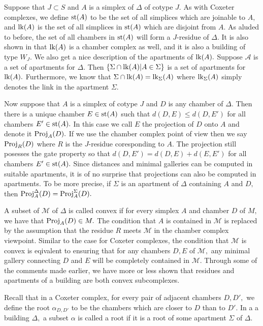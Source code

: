 \documentclass[class=book, crop=false,12 pt]{standalone}
\begin{document}
Suppose that $J\subset S$ and $A$ is a simplex of $\Delta$ of cotype $J.$ As with Coxeter complexes, we define $\mathrm{st}(A)$ to be the set of all simplices which are joinable to $A,$ and $\mathrm{lk}(A)$ is the set of all simplices in $\mathrm{st}(A)$ which are disjoint from $A.$ As aluded to before, the set of all chambers in $\mathrm{st}(A)$ will form a $J$-residue of $\Delta.$ It is also shown in \cite{buildings} that $\mathrm{lk}(A)$ is a chamber complex as well, and it is also a building of type $W_J.$ We also get a nice description of the apartments of $\mathrm{lk}(A).$ Suppose $\mathcal{A}$ is a set of apartments for $\Delta.$ Then $\{\Sigma\cap \mathrm{lk}(A)|A\in \Sigma\}$ is a set of apartments for $\mathrm{lk}(A).$ Furthermore, we know that $\Sigma\cap \mathrm{lk}(A)=\mathrm{lk}_{\Sigma}(A)$ where $\mathrm{lk}_{\Sigma}(A)$ simply denotes the link in the apartment $\Sigma.$

Now suppose that $A$ is a simplex of cotype $J$ and $D$ is any chamber of $\Delta.$ Then there is a unique chamber $E\in \mathrm{st}(A)$ such that $d(D,E)\le d(D,E')$ for all chambers $E'\in \mathrm{st}(A).$ In this case we call $E$ the projection of $D$ onto $A$ and denote it $\mathrm{Proj}_A(D).$ If we use the chamber complex point of view then we say $\mathrm{Proj}_R(D)$ where $R$ is the $J$-residue coresponding to $A.$ The projection still posesses the gate property so that $d(D,E')=d(D,E)+d(E,E')$ for all chambers $E'\in \mathrm{st}(A).$ Since distances and minimal galleries can be computed in suitable apartments, it is of no surprise that projections can also be computed in apartments. To be more precise, if $\Sigma$ is an apartment of $\Delta$ containing $A$ and $D,$ then $\mathrm{Proj}_A^\Delta(D)=\mathrm{Proj}_A^\Sigma(D).$ 

A subset of $\mathcal{M}$ of $\Delta$ is called convex if for every simplex $A$ and chamber $D$ of $M,$ we have that $\mathrm{Proj}_A(D)\in M.$ The condition that $A$ is contained in $\mathcal{M}$ is replaced by the assumption that the residue $R$ meets $\mathcal{M}$ in the chamber complex viewpoint. Similar to the case for Coxeter complexes, the condition that $\mathcal{M}$ is convex is eqivalent to ensuring that for any chambers $D,E$ of $\mathcal{M},$ any minimal gallery connecting $D$ and $E$ will be completely contained in $\mathcal{M}.$ Through some of the comments made earlier, we have more or less shown that residues and apartments of a building are both convex subcomplexes. 

Recall that in a Coxeter complex, for every pair of adjacent chambers $D,D',$ we define the root $\alpha_{D,D'}$ to be the chambers which are closer to $D$ than to $D'.$ In a a building $\Delta,$ a subset $\alpha$ is called a root if it is a root of some apartment $\Sigma$ of $\Delta.$
\end{document}
